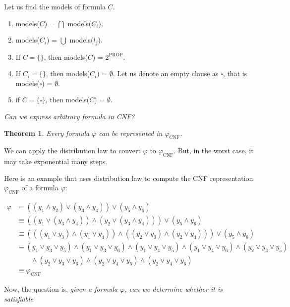 \documentclass{article}
\newtheorem{theorem}{Theorem}
\begin{document}
Let us find the models of formula $C$.
\begin{enumerate}
	\item models($C$) = $\bigcap$ models($C_i$).
	\item models($C_i$) = $\bigcup$ models($l_j$).
	\item If $C = \{\}$, then models($C$) = $2^{\text{PROP}}$.
	\item If $C_{i} = \{\}$, then models($C_i$) = $\emptyset$. Let us denote an empty clause as $\square$, that is models($\square$) = $\emptyset$.
	\item if $C = \{ \square\}$, then  models($C$) = $\emptyset$.

\end{enumerate}

\textit{Can we express arbitrary formula in CNF?}
\begin{theorem}
Every formula $\varphi$ can be represented in $\varphi_{\text{CNF}}$.
\end{theorem}

We can apply the distribution law to convert $\varphi$ to $\varphi_{\text{CNF}}$. But, in the worst case, it may take exponential many steps.

Here is an example that uses distribution law to compute the CNF representation $\varphi_{\text{CNF}}$ of a formula $\varphi$:

\begin{align*}
\varphi &= ((y_1 \land y_2) \lor (y_3 \land y_4)) \lor (y_5 \land y_6)\\
		&\equiv ((y_1 \lor (y_3 \land y_4))  \land (y_2 \lor (y_3 \land y_4))) \lor (y_5 \land y_6)\\
		&\equiv (((y_1 \lor y_3) \land (y_1 \lor y_4))  \land ((y_2 \lor y_3) \land (y_2 \lor y_4))) \lor (y_5 \land y_6)\\
		&\equiv (y_1 \lor y_3 \lor y_5)  \land (y_1 \lor y_3 \lor y_6) \land (y_1 \lor y_4 \lor y_5)  \land (y_1 \lor y_4 \lor y_6) \land (y_2 \lor y_3 \lor y_5)  \\
		& \quad \quad \land (y_2 \lor y_3 \lor y_6) \land (y_2 \lor y_4 \lor y_5)  \land (y_2 \lor y_4 \lor y_6) \\
		&\equiv \varphi_{\text{CNF}}
\end{align*}


Now, the question is, \emph{given a formula $\varphi$, can we determine whether it is satisfiable }
\end{document}
